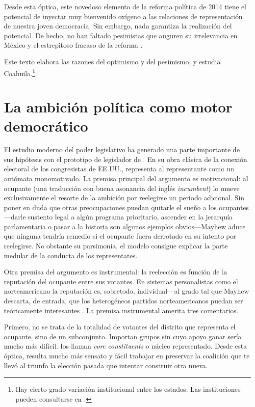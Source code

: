 \documentclass[letter,12pt]{article}
\begin{document}
Desde esta óptica, este novedoso elemento de la reforma política de 2014 tiene el potencial de inyectar muy bienvenido oxígeno a las relaciones de representación de nuestra joven democracia. Sin embargo, nada garantiza la realización del potencial. De hecho, no han faltado pesimistas que auguren su irrelevancia en México y el estrepitoso fracaso de la reforma \citep{merinoFierroZarkin2013Blog}. 

Este texto elabora las razones del optimismo y del pesimismo, y estudia Coahuila.\footnote{Hay cierto grado variación institucional entre los estados. Las instituciones pueden consultarse en \citet{magarInstReel.2017}.}

\section{La ambición política como motor democrático}

\noindent El estudio moderno del poder legislativo ha generado una parte importante de sus hipótesis con el prototipo de legislador de \citet{mayhew.1974}. En su obra clásica de la conexión electoral de los congresistas de EE.UU., representa al representante como un autómata monomotivado. La premisa principal del argumento es motivacional: al ocupante (una traducción con buena asonancia del ingĺés \emph{incumbent}) lo mueve exclusivamente el resorte de la ambición por reelegirse un periodo adicional. Sin poner en duda que otras preocupaciones puedan quitarle el sueño a los ocupantes---darle sustento legal a algún programa prioritario, ascender en la jerarquía parlamentaria o pasar a la historia son algunos ejemplos obvios---Mayhew aduce que ninguna tendría remedio si el ocupante fuera derrotado en su intento por reelegirse. No obstante su parsimonia, el modelo consigue explicar la parte medular de la conducta de los representates. 

Otra premisa del argumento es instrumental: la reelección es función de la reputación del ocupante entre sus votantes. En sistemas personalistas como el norteamericano la reputación es, sobretodo, individual---al grado tal que Mayhew descarta, de entrada, que los heterogéneos partidos norteamericanos puedan ser teóricamente interesantes \citep[aunque el revisionismo ha recuperado la relevancia de los partidos,][]{cox.mccubbins.1993,aldrich.1995}. La premisa instrumental amerita tres comentarios. 

Primero, no se trata de la totalidad de votantes del distrito que representa el ocupante, sino de un subconjunto. Importan grupos sin cuyo apoyo ganar sería mucho más difícil. \citet{cox.mccubbins.1986} los llaman \emph{core constituents} o núcleo representado. Desde esta óptica, resulta mucho más sensato y fácil trabajar en preservar la coalición que te llevó al triunfo la elección pasada que intentar construir otra nueva.
\end{document}
